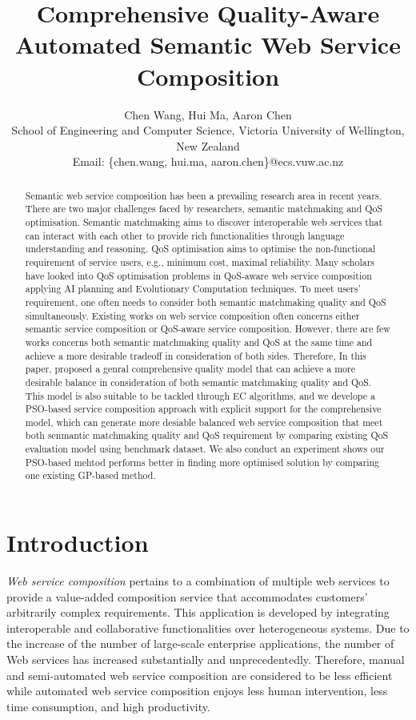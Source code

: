 \documentclass{IEEEtran}
\title{Comprehensive Quality-Aware Automated Semantic Web Service Composition}
\author{Chen Wang, Hui Ma, Aaron Chen\\ \small School of
Engineering and Computer Science, Victoria University of Wellington, New Zealand\\
Email: \{chen.wang, hui.ma, aaron.chen\}@ecs.vuw.ac.nz}
\begin{document}
\maketitle
\begin{abstract}
Semantic web service composition has been a prevailing research area in recent years. There are two major challenges faced by researchers, semantic matchmaking and QoS optimisation. Semantic matchmaking aims to discover interoperable web services that can interact with each other to provide rich functionalities through language understanding and reasoning. QoS optimisation aims to optimise the non-functional requirement of service users, e.g., minimum cost, maximal reliability. Many scholars have looked into QoS optimisation problems in QoS-aware web service composition applying AI planning and Evolutionary Computation techniques. To meet users' requirement, one often needs to consider both semantic matchmaking quality and QoS simultaneously. Existing works on web service composition often concerns either semantic service composition or QoS-aware service composition. However, there are few works concerns both semantic matchmaking quality and QoS at the same time and achieve a more 
desirable tradeoff in consideration of both sides. Therefore, In this paper, proposed a genral comprehensive quality model that can achieve a more desirable balance in consideration of both semantic matchmaking quality and QoS. This model is also suitable to be tackled through EC algorithms, and we develope a PSO-based service composition approach with explicit support for the comprehensive model, which can generate more desiable balanced web service composition that meet both senmantic matchmaking quality and QoS requirement by comparing existing QoS evaluation model using benchmark dataset. We also conduct an experiment shows our PSO-based mehtod performs better in finding more optimised solution by comparing one existing GP-based method.

\end{abstract}
\section{Introduction}\label{introduction}

\textit{Web service composition} pertains to a combination of multiple web services to provide a value-added composition service that accommodates customers' arbitrarily complex requirements. This application is developed by integrating interoperable and collaborative functionalities over heterogeneous systems. Due to the increase of the number of large-scale enterprise applications, the number of Web services has increased substantially and unprecedentedly. Therefore, manual and semi-automated web service composition are considered to be less efficient while automated web service composition enjoys less human intervention, less time consumption, and high productivity.
\end{document}
